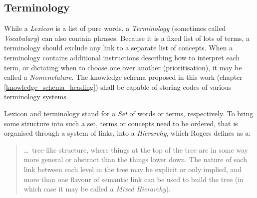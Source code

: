 %
%
%
%
%
%
%

\subsection{Terminology}
\label{terminology_heading}

While a \emph{Lexicon} is a list of pure words, a \emph{Terminology} (sometimes
called \emph{Vocabulary}) can also contain phrases. Because it is a fixed list
of lots of terms, a terminology should exclude any link to a separate list of
concepts. When a terminology contains additional instructions describing how to
interpret each term, or dictating when to choose one over another
(prioritisation), it may be called a \emph{Nomenclature}. The knowledge schema
proposed in this work (chapter \ref{knowledge_schema_heading}) shall be capable
of storing codes of various terminology systems.

Lexicon and terminology stand for a \emph{Set} of words or terms, respectively.
To bring some structure into such a set, terms or concepts need to be ordered,
that is organised through a system of links, into a \emph{Hierarchy}, which
Rogers \cite{rogers} defines as a:

\begin{quote}
    \ldots\ tree-like structure, where things at the top of the tree are in some
    way more general or abstract than the things lower down. The nature of each
    link between each level in the tree may be explicit or only implied, and
    more than one flavour of semantic link can be used to build the tree (in
    which case it may be called a \emph{Mixed Hierarchy}).
\end{quote}

